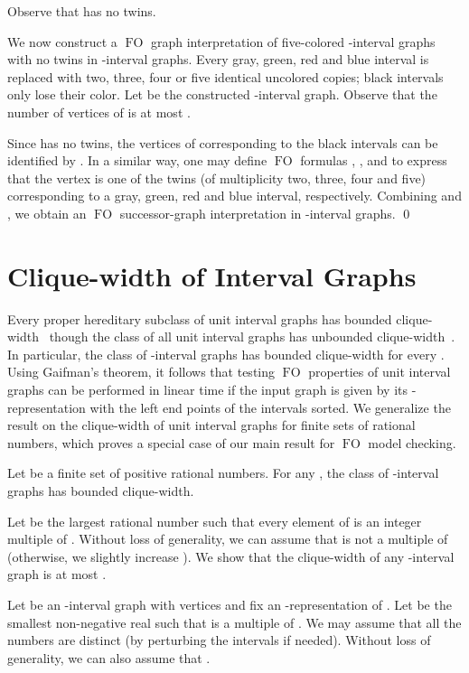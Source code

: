 \documentclass{CSML}
\newcommand{\FO}{\ensuremath{\operatorname{FO}}\xspace}
\theoremstyle{plain}\newtheorem{claim}[thm]{Claim}
\begin{document}
Observe that  has no twins.

We now construct a \FO graph interpretation  of five-colored -interval graphs
with no twins in -interval graphs.
Every gray, green, red and blue interval is replaced with two, three, four or five
identical uncolored copies; black intervals only lose their color.
Let  be the constructed -interval graph.
Observe that the number of vertices of  is at most .

Since  has no twins, the vertices of  corresponding to the black intervals can be identified
by
.
In a similar way, one may define \FO formulas , ,  and 
to express that the vertex  is one of the twins (of multiplicity two, three, four and five) corresponding to a gray, green, red and blue interval, respectively.
Combining  and , we obtain an \FO successor-graph interpretation in -interval graphs.
\qed


\section{Clique-width of Interval Graphs}
\label{sec:clique}


Every proper hereditary subclass of unit interval graphs has bounded clique-width~\cite{loz08}
though the class of all unit interval graphs has unbounded clique-width~\cite{GR00}.
In particular, the class of -interval graphs has bounded
clique-width for every . Using Gaifman's theorem, it follows that
testing \FO properties of unit interval graphs can be performed in linear time
if the input graph is given by its -representation
with the left end points of the intervals sorted.
We generalize the result on the clique-width of unit interval graphs for finite sets  of rational numbers,
which proves a special case of our main result for \FO model checking.

\begin{prop}
\label{prop:Ld-boundedcw}
Let  be a finite set of positive rational numbers.
For any , the class of -interval graphs has bounded clique-width.
\end{prop}

\proof
Let  be the largest rational number such that every element of 
is an integer multiple of . Without loss of generality, we can assume
that  is not a multiple of  (otherwise, we slightly increase ).
We show that the clique-width of any
-interval graph is at most .

Let  be an -interval graph with vertices  and
fix an -representation of . Let  be the smallest
non-negative real such that  is a multiple of .
We may assume that all the numbers  are distinct (by perturbing the intervals if needed).
Without loss of generality, we can also assume that .
\end{document}
